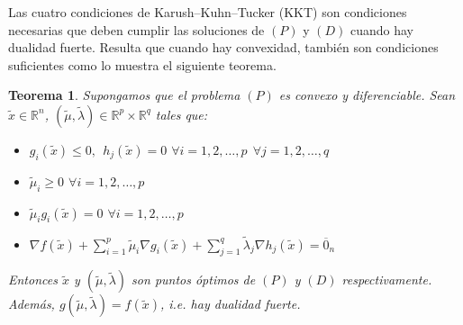 \documentclass[11pt]{report}
\newtheorem{theorem}{Teorema}[section]
\newcommand{\Rn}{\mathbb{R}^{n}}
\newcommand{\Rp}{\mathbb{R}^{p}}
\newcommand{\Rq}{\mathbb{R}^{q}}
\newcommand{\z}{\overline{0}_{n}}
\newcommand{\Sp}{1,2,\ldots, p}
\newcommand{\Sq}{1,2,\ldots, q}
\newcommand{\xc}{\widetilde{x}}
\newcommand{\muc}{\widetilde{\mu}}
\newcommand{\lac}{\widetilde{\lambda}}
\begin{document}
Las cuatro condiciones de Karush--Kuhn--Tucker (KKT) son condiciones necesarias que deben cumplir las soluciones de $(P)$ y $(D)$ cuando hay dualidad fuerte. Resulta que cuando hay convexidad, también son condiciones suficientes como lo muestra el siguiente teorema.

\begin{theorem}
Supongamos que el problema $(P)$ es convexo y diferenciable. Sean $\xc\in\Rn$, $(\muc, \lac)\in\Rp\times\Rq$ tales que:
\begin{itemize}
\item[(i)] $g_{i}(\xc)\leq0,\ \ h_{j}(\xc)=0$ $\forall i=\Sp\ \ \forall j=\Sq$
\item[(ii)] $\muc_{i}\geq0$ $\forall i=\Sp$
\item[(iii)] $\muc_{i}g_{i}(\xc)=0$ $\forall i=\Sp$
\item[(iv)] $\nabla f(\xc)+\sum_{i=1}^{p}\muc_{i}\nabla g_{i}(\xc) + \sum_{j=1}^{q}\lac_{j}\nabla h_{j}(\xc)=\z$
\end{itemize}
Entonces $\xc$ y $(\muc,\lac)$ son puntos óptimos de $(P)$ y $(D)$ respectivamente. Además, $g(\muc,\lac)=f(\xc)$, i.e. hay dualidad fuerte.
\end{theorem}
\end{document}
